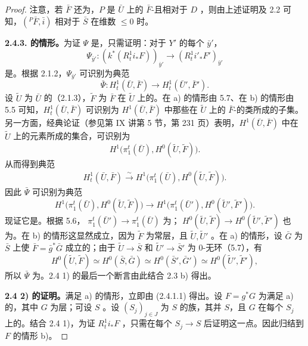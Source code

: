 \begin{proof}
注意，若 $\bar F$ 还为，$P$ 是 $\bar U$ 上的 $\bar F$-且相对于 $D$ ，则由上述证明及 2.2 可知，$({}^P\bar F,\bar i)$ 相对于 $\bar S$ 在维数 $\leqslant0$ 时。

\textbf{2.4.3. 的情形。}为证 $\Psi$ 是，只需证明：对于 $Y'$ 的每个 $\bar y'$，
\[\Psi_{\bar y'}:(k^*(R^1_ti_*F))_{\bar y'}\longrightarrow(R^1_ti'_*F')_{\bar y'}\]
是。根据 2.1.2，$\Psi_{\bar y'}$ 可识别为典范
\[\bar\Psi:H^1_t(\bar U,\bar F)\longrightarrow H^1_t(\bar U',\bar F').\]
设 $\widetilde U$ 为 $\bar U$ 的（2.1.3），$\widetilde F$ 为 $\bar F$ 在 $\widetilde U$ 上的。在 a) 的情形由 5.7、在 b) 的情形由 5.5 可知，$H^1_t(\bar U,\bar F)$ 可识别为 $H^1(\bar U,\bar F)$ 中那些在 $\widetilde U$ 上的 $\bar F$-的类所成的子集。另一方面，经典论证（参见第 IX 讲第 5 节，第 231 页）表明，$H^1(\bar U,\bar F)$ 中在 $\widetilde U$ 上的元素所成的集合，可识别为
\[H^1\bigl(\pi_1^t(\bar U),H^0(\widetilde U,\widetilde F)\bigr).\]
从而得到典范
\[H^1_t(\bar U,\bar F)\xrightarrow{\sim}H^1\bigl(\pi_1^t(\bar U),H^0(\widetilde U,\widetilde F)\bigr).\tag{2.4.3.1}\]
因此 $\bar\Psi$ 可识别为典范
\[H^1\bigl(\pi_1^t(\bar U),H^0(\widetilde U,\widetilde F)\bigr)\longrightarrow H^1\bigl(\pi_1^t(\bar U'),H^0(\widetilde U',\widetilde F')\bigr).\]
现证它是。根据 5.6， $\pi_1^t(\bar U')\to\pi_1^t(\bar U)$ 为； $H^0(\widetilde U,\widetilde F)\to H^0(\widetilde U',\widetilde F')$ 也为。在 b) 的情形这显然成立，因为 $\widetilde F$ 为常层，且 $\widetilde U,\widetilde U'$ 。在 a) 的情形，设 $\bar G$ 为 $\bar S$ 上使 $\bar F=\bar g^*\bar G$ 成立的；由于 $\widetilde U\to\bar S$ 和 $\widetilde U'\to\bar S'$ 为 0-无环（5.7），有
\[H^0(\widetilde U,\widetilde F)\simeq H^0(\bar S,\bar G)\simeq H^0(\bar S',\bar G')\simeq H^0(\widetilde U',\widetilde F'),\]
所以 $\bar\Psi$ 为。2.4 1) 的最后一个断言由此结合 2.3 b) 得出。

\textbf{2.4 2) 的证明。}满足 a) 的情形，立即由 (2.4.1.1) 得出。设 $F=g^*G$ 为满足 a) 的，其中 $G$ 为层；可设 $S$ 。设 $(S_j)_{j\in J}$ 为 $S$ 的族，其并 $S$，且 $G$ 在每个 $S_j$ 上的。结合 2.4 1)，为证 $R^1_ti_*F$ ，只需在每个 $S_j\to S$ 后证明这一点。因此归结到 $F$ 的情形 b)。


\end{proof}
